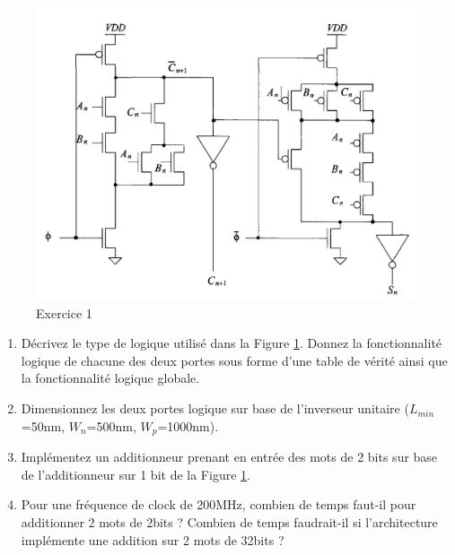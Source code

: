 \documentclass[paper=a4, fontsize=11pt]{article} %
\numberwithin{equation}{section} %
\numberwithin{figure}{section} %
\numberwithin{table}{section} %
\begin{document}
\begin{figure}[!htbp]
   \centering
   \includegraphics[width=13cm]{figure/fig9-3.png}
   \caption{Exercice 1}
   \label{fig9-3}
\end{figure}

\begin{enumerate}
\item  Décrivez le type de logique utilisé dans la Figure \ref{fig9-3}. Donnez la fonctionnalité logique de chacune des deux portes sous forme d'une table de vérité ainsi que la fonctionnalité logique globale.
\item  Dimensionnez les deux portes logique sur base de l'inverseur unitaire ($L_{min}$=50nm, $W_{n}$=500nm, $W_{p}$=1000nm).
\item  Implémentez un additionneur prenant en entrée des mots de 2 bits sur base de l'additionneur sur 1 bit de la Figure \ref{fig9-3}.
\item  Pour une fréquence de clock de 200MHz, combien de temps faut-il pour additionner 2 mots de 2bits ? Combien de temps faudrait-il si l'architecture implémente une addition sur 2 mots de 32bits ?
\end{enumerate}
\end{document}
